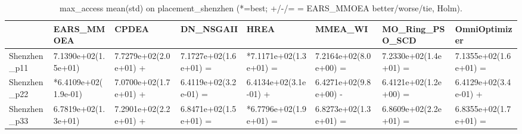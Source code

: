 \begin{table}[t]
\centering
\caption{max_access mean(std) on placement_shenzhen (*=best; +/-/= = EARS_MMOEA better/worse/tie, Holm).}
\label{tab:placement_shenzhen_max_access}
\begin{tabular}{llllllll}
\toprule
 & EARS\_MMOEA & CPDEA & DN\_NSGAII & HREA & MMEA\_WI & MO\_Ring\_PSO\_SCD & OmniOptimizer \\
\midrule
Shenzhen\_p11 & 7.1390e+02(1.5e+01) & 7.7279e+02(2.0e+01) + & 7.1727e+02(1.6e+01) = & *7.1171e+02(1.3e+01) = & 7.2164e+02(8.0e+00) = & 7.2330e+02(1.4e+01) = & 7.1355e+02(1.6e+01) = \\
Shenzhen\_p22 & *6.4109e+02(1.9e-01) & 7.0700e+02(1.7e+01) + & 6.4119e+02(3.2e-01) = & 6.4134e+02(3.1e-01) + & 6.4271e+02(9.8e+00) - & 6.4121e+02(1.2e+00) = & 6.4129e+02(3.4e-01) + \\
Shenzhen\_p33 & 6.7819e+02(1.3e+01) & 7.2901e+02(2.2e+01) + & 6.8471e+02(1.5e+01) = & *6.7796e+02(1.9e+01) = & 6.8273e+02(1.3e+01) = & 6.8609e+02(2.2e+01) = & 6.8355e+02(1.7e+01) = \\
\bottomrule
\end{tabular}
\end{table}
